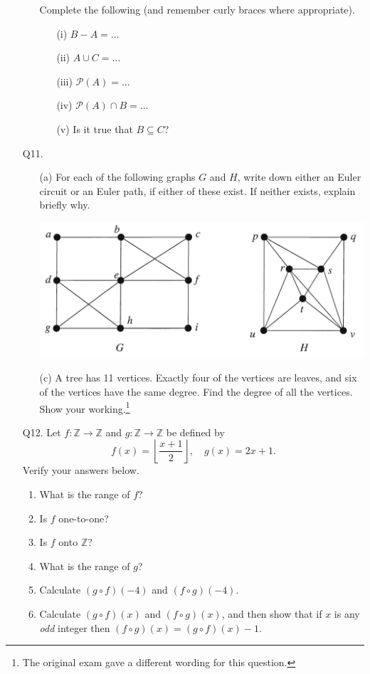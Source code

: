 \documentclass[a4paper,11pt]{article}
\newcommand{\Z}{\mathbb{Z}}
\newcommand{\floor}[1]{\left \lfloor #1 \right \rfloor}
\begin{document}
\begin{enumerate}
\begin{enumerate}
Complete the following (and remember curly braces where appropriate).
\begin{enumerate}
\item[(i)] $B-A = \dots$
\item[(ii)] $A \cup C = \dots$
\item[(iii)] $\mathcal{P}(A) = \dots$
\item[(iv)] $\mathcal{P}(A) \cap B = \dots$
\item[(v)] Is it true that $B \subseteq C$?
\end{enumerate}
\end{enumerate}


\item[Q11.]
\begin{enumerate}
\item[(a)] For each of the following graphs $G$ and $H$,
write down either an Euler circuit or an Euler path, if either of these exist.
If neither exists, explain briefly why.

\begin{center}
\includegraphics[scale=0.6]{src/1101q11a.png}
\end{center}

\item[(c)] A tree has 11 vertices. Exactly four of the vertices are leaves,
and six of the vertices have the same degree. Find the degree of all the
vertices. Show your working.\footnote{The original exam gave a different
wording for this question.}
\end{enumerate}

\item[Q12.]
Let $f : \Z \to \Z$ and $g : \Z \to \Z$ be defined by
\[
    f(x) = \floor{\frac{x+1}{2}}, \quad g(x) = 2x + 1.
\]
Verify your answers below.
\begin{enumerate}
\item
What is the range of $f$?
\item
Is $f$ one-to-one?
\item
Is $f$ onto $\Z$?
\item
What is the range of $g$?
\item
Calculate $(g \circ f)(-4)$ and $(f \circ g)(-4)$.
\item
Calculate $(g \circ f)(x)$ and $(f \circ g)(x)$, and then show that if $x$ is
any {\em odd} integer then $(f \circ g)(x) = (g \circ f)(x) - 1$.
\end{enumerate}


\end{enumerate}
\end{document}
